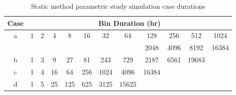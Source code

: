 \documentclass[review,12pt]{elsarticle}
\begin{document}
\begin{table}[htbp!]
\centering
\caption{Static method parametric study simulation case durations}
\label{tab:static case durations}
\begin{tabular}{cccccccccccc}
Case                                     & \multicolumn{11}{c}{Bin Duration (hr)}                                                                                                                                                                                                                                                                             \\ \hline
\multicolumn{1}{|c|}{\multirow{2}{*}{a}} & \multicolumn{1}{c|}{1} & \multicolumn{1}{c|}{2}  & \multicolumn{1}{c|}{4}   & \multicolumn{1}{c|}{8}     & \multicolumn{1}{c|}{16}    & \multicolumn{1}{c|}{32}    & \multicolumn{1}{c|}{64}    & \multicolumn{1}{c|}{128}   & \multicolumn{1}{c|}{256}  & \multicolumn{1}{c|}{512}   & \multicolumn{1}{c|}{1024}  \\ \cline{2-12} 
\multicolumn{1}{|c|}{}                   &                        &                         &                          &                            &                            &                            & \multicolumn{1}{c|}{}      & \multicolumn{1}{c|}{2048}  & \multicolumn{1}{c|}{4096} & \multicolumn{1}{c|}{8192}  & \multicolumn{1}{c|}{16384} \\ \hline
\multicolumn{1}{|c|}{b}                  & \multicolumn{1}{c|}{1} & \multicolumn{1}{c|}{3}  & \multicolumn{1}{c|}{9}   & \multicolumn{1}{c|}{27}    & \multicolumn{1}{c|}{81}    & \multicolumn{1}{c|}{243}   & \multicolumn{1}{c|}{729}   & \multicolumn{1}{c|}{2187}  & \multicolumn{1}{c|}{6561} & \multicolumn{1}{c|}{19683} &                            \\ \cline{1-11}
\multicolumn{1}{|c|}{c}                  & \multicolumn{1}{c|}{1} & \multicolumn{1}{c|}{4}  & \multicolumn{1}{c|}{16}  & \multicolumn{1}{c|}{64}    & \multicolumn{1}{c|}{256}   & \multicolumn{1}{c|}{1024}  & \multicolumn{1}{c|}{4096}  & \multicolumn{1}{c|}{16384} &                           &                            &                            \\ \cline{1-9}
\multicolumn{1}{|c|}{d}                  & \multicolumn{1}{c|}{1} & \multicolumn{1}{c|}{5}  & \multicolumn{1}{c|}{25}  & \multicolumn{1}{c|}{125}   & \multicolumn{1}{c|}{625}   & \multicolumn{1}{c|}{3125}  & \multicolumn{1}{c|}{15625} &                            &                           &                            &                            \\ \cline{1-8}

\end{tabular}
\end{table}
\end{document}
